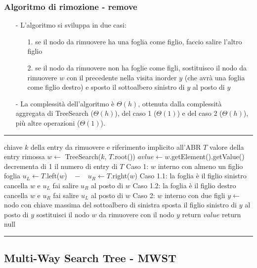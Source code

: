 \documentclass[a4paper]{article}
\makeatletter
\newenvironment{algo}[4]{
	\noindent\rule{\textwidth}{0.4pt}
	\begin{algorithmic}[1]
		\addtocounter{ALG@line}{-1}
		\Procedure{#1}{#2}
		\Require #3
		\Ensure #4
		\Statex }{
		\EndProcedure
	\end{algorithmic}
	\rule{\textwidth}{0.4pt}}
\makeatother
\begin{document}
\subsubsection*{Algoritmo di rimozione - remove}
\begin{itemize}[topsep=3pt, itemsep=0pt]
	\item[-] L'algoritmo si sviluppa in due casi:
	\begin{itemize}[topsep=0pt, itemsep=0pt]
		\item[1.] se il nodo da rimuovere ha una foglia come figlio, faccio salire l'altro figlio
		\item[2.] se il nodo da rimuovere non ha foglie come figli, sostituisco il nodo da rimuovere \(w\) con il precedente nella
		visita inorder \(y\) (che avrà una foglia come figlio destro) e sposto il sottoalbero sinistro di \(y\) al posto di \(y\)
	\end{itemize}
	\item[-] La complessità dell'algoritmo è \(\Theta(h)\), ottenuta dalla complessità aggregata di TreeSearch (\(\Theta(h)\)),
	del caso 1 (\(\Theta(1)\)) e del caso 2 (\(\Theta(h)\)), più altre operazioni (\(\Theta(1)\)).
\end{itemize}
\begin{algo}{remove}{$k$}{chiave $k$ della entry da rimuovere e riferimento implicito all'ABR $T$}{valore della entry rimossa}
	\State $w \gets$ TreeSearch($k$, $T$.root())
		\State $avlue \gets w$.getElement().getValue()
		\State decrementa di 1 il numero di entry di $T$
		\State \Comment Caso 1: $w$ interno con almeno un figlio foglia
			\State $u_L \gets T$.left($w$) $\;\; - \;\;$ $u_R \gets T$.right($w$)
			 \Comment Caso 1.1: la foglia è il figlio sinistro
				\State cancella $w$ e $u_L$
				\State fai salire $u_R$ al posto di $w$
			\Else \Comment Caso 1.2: la foglia è il figlio destro
				\State cancella $w$ e $u_R$
				\State fai salire $u_L$ al posto di $w$
			\EndIf
		\Else \Comment Caso 2: $w$ interno con due figli
			\State $y \gets$ nodo con chiave massima del sottoalbero di sinistra
			\State sposta il figlio sinistro di $y$ al posto di $y$
			\State sostituisci il nodo $w$ da rimuovere con il nodo $y$
		\EndIf
		\State return $value$
	\Else
		\State return null
	\EndIf
\end{algo}

\newpage

\subsection{Multi-Way Search Tree - MWST}
\end{document}

